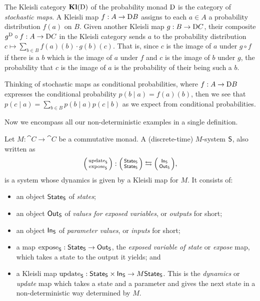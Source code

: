 \documentclass[DynamicalBook]{subfiles}
\begin{document}
\begin{example}\label{ex.probset_kleisli}
  The Kleisli category $\textbf{Kl}(\mathrm{D})$ of the probability monad $\mathrm{D}$
  is the category of \emph{stochastic maps}. A Kleisli map $f : A \to \mathrm{D}
  B$ assigns to each $a \in A$ a probability distribution $f(a)$ on $B$. Given
  another Kleisli map $g : B \to \mathrm{D} C$, their composite $g^{\mathrm{D}}
  \circ f : A \to \mathrm{D} C$ in the Kleisli category sends $a$ to the
  probability distribution $c \mapsto \sum_{b \in B}
  f(a)(b) \cdot g(b)(c)$. That is, since $c$ is the image of $a$ under $g \circ f$ if there is a $b$ which
  is the image of $a$ under $f$ and $c$ is the image of $b$ under $g$, the
  probability that $c$ is the image of $a$ is the probability of their being
  such a $b$.

  Thinking of stochastic maps as conditional probabilities, where $f : A \to
  \mathrm{D} B$ expresses the conditional probability $p(b \mid a) = f(a)(b)$,
  then we see that
  $p(c \mid a) = \sum_{b \in B} p(b \mid a) p(c \mid b)$
  as we expect from conditional probabilities.
\end{example}


Now we encompass all our non-deterministic examples in a single definition.
\begin{definition}\label{def.monadic_system}
Let $M : \cat{C} \to \cat{C}$ be a commutative monad. A (discrete-time)
$M$-system $\mathsf{S}$, also written as   
  $$\lens{\update{S}}{\expose{S}} : \lens{\State{S}}{\State{S}} \leftrightarrows \lens{\In{S}}{\Out{S}},$$ 
is a system whose dynamics is given by a Kleisli map for $M$. It consists of:
  \begin{itemize}
    \item an object $\mathsf{State}_{\mathsf{S}}$ of \emph{states};
    \item an object $\mathsf{Out}_{\mathsf{S}}$ of \emph{values for exposed variables}, or \emph{outputs}
      for short;
    \item an object $\mathsf{In}_{\mathsf{S}}$ of \emph{parameter values}, or \emph{inputs} for short;
    \item a map $\mathrm{expose}_{\mathsf{S}} : \mathsf{State}_{\mathsf{S}} \to \mathsf{Out}_{\mathsf{S}}$, the \emph{exposed variable of state} or
      \emph{expose} map, which takes a state to the output it yields; and
    \item a Kleisli map $\mathrm{update}_{\mathsf{S}} : \mathsf{State}_{\mathsf{S}} \times \mathsf{In}_{\mathsf{S}} \to
     M\mathsf{State}_{\mathsf{S}}$. This is the \emph{dynamics} or
      \emph{update} map which takes a state and a parameter and gives the
      next state in a non-deterministic way determined by $M$.
  \end{itemize}
\end{definition}
\end{document}
